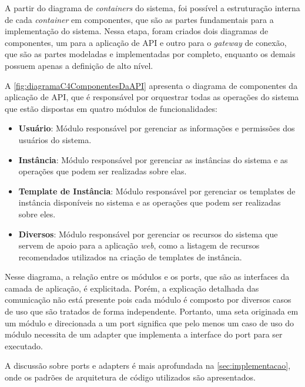 A partir do diagrama de \textit{containers} do sistema, foi possível a estruturação interna de cada \textit{container} em componentes, que são as partes fundamentais para a implementação do sistema.
Nessa etapa, foram criados dois diagramas de componentes, um para a aplicação de API e outro para o \textit{gateway} de conexão, que são as partes modeladas e implementadas por completo, enquanto os demais possuem apenas a definição de alto nível.

A \autoref{fig:diagramaC4ComponentesDaAPI} apresenta o diagrama de componentes da aplicação de API, que é responsável por orquestrar todas as operações do sistema que estão dispostas em quatro módulos de funcionalidades:

\begin{itemize}
    \item \textbf{Usuário}: Módulo responsável por gerenciar as informações e permissões dos usuários do sistema.

    \item \textbf{Instância}: Módulo responsável por gerenciar as instâncias do sistema e as operações que podem ser realizadas sobre elas.

    \item \textbf{Template de Instância}: Módulo responsável por gerenciar os templates de instância disponíveis no sistema e as operações que podem ser realizadas sobre eles.

    \item \textbf{Diversos}: Módulo responsável por gerenciar os recursos do sistema que servem de apoio para a aplicação \textit{web}, como a listagem de recursos recomendados utilizados na criação de templates de instância.

\end{itemize}

Nesse diagrama, a relação entre os módulos e os \glspl{port}, que são as interfaces da camada de aplicação, é explicitada. Porém, a explicação detalhada das comunicação não está presente pois cada módulo é composto por diversos casos de uso que são tratados de forma independente. Portanto, uma seta originada em um módulo e direcionada a um \gls{port} significa que pelo menos um caso de uso do módulo necessita de um \gls{adapter} que implementa a interface do \gls{port} para ser executado. 

A discussão sobre \glspl{port} e \glspl{adapter} é mais aprofundada na \autoref{sec:implementacao},
onde os padrões de arquitetura de código utilizados são apresentados.

